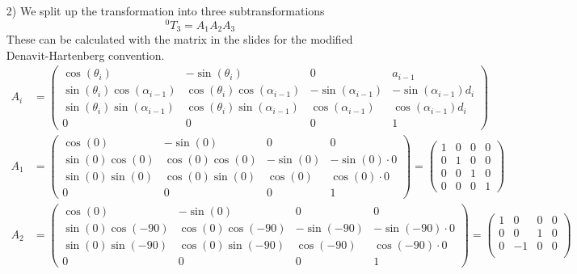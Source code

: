 \documentclass[a4paper,11pt]{article}
\begin{document}
\begin {enumerate}
\begin{enumerate}
        \item[2)] We split up the transformation into three subtransformations
        $${^0T_3} = A_1A_2A_3$$
        These can be calculated with the matrix in the slides for the modified Denavit-Hartenberg convention.
        \begin{align*}
          A_i &=
          \begin{pmatrix}
            \cos(\theta_i) & -\sin(\theta_i) & 0 & a_{i-1}\\
            \sin(\theta_i)\cos(\alpha_{i-1}) & \cos(\theta_i)\cos(\alpha_{i-1}) & -\sin(\alpha_{i-1}) & -\sin(\alpha_{i-1})d_i\\
            \sin(\theta_i)\sin(\alpha_{i-1}) & \cos(\theta_i)\sin(\alpha_{i-1}) & \cos(\alpha_{i-1}) & \cos(\alpha_{i-1})d_i\\
            0 & 0 & 0 & 1
          \end{pmatrix}\\
          A_1 &=
            \begin{pmatrix}
              \cos(0) & -\sin(0) & 0 & 0\\
              \sin(0)\cos(0) & \cos(0)\cos(0) & -\sin(0) & -\sin(0) \cdot 0\\
              \sin(0)\sin(0) & \cos(0)\sin(0) & \cos(0) & \cos(0) \cdot 0\\
              0 & 0 & 0 & 1
            \end{pmatrix} = \begin{pmatrix}
              1 & 0 & 0 & 0\\
              0 & 1 & 0 & 0\\
              0 & 0 & 1 & 0\\
              0 & 0 & 0 & 1
            \end{pmatrix}\\
          A_2 &=
            \begin{pmatrix}
              \cos(0) & -\sin(0) & 0 & 0\\
              \sin(0)\cos(-90) & \cos(0)\cos(-90) & -\sin(-90) & -\sin(-90) \cdot 0\\
              \sin(0)\sin(-90) & \cos(0)\sin(-90) & \cos(-90) & \cos(-90) \cdot 0\\
              0 & 0 & 0 & 1
            \end{pmatrix} = \begin{pmatrix}
              1 & 0 & 0 & 0\\
              0 & 0 & 1 & 0\\
              0 & -1 & 0 & 0\\

\end{pmatrix}
\end{align*}
\end{enumerate}
\end{enumerate}
\end{document}
